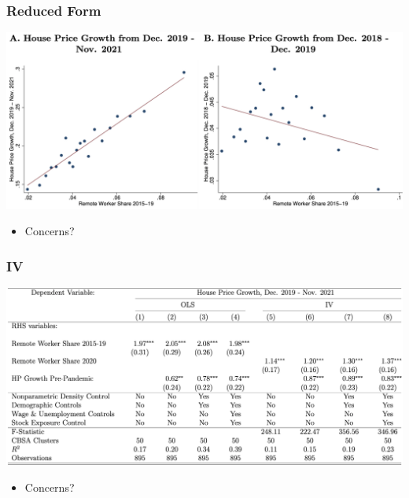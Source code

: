 \documentclass[english,xcolor=svgnames]{beamer}
\begin{document}
\begin{frame}
	\frametitle[alignment=center]{Reduced Form}
	\begin{center}
		\includegraphics[scale=0.4]{figures/MWFIG3.png}
	\end{center}
	\begin{itemize}
		\item Concerns?
	\end{itemize}
\end{frame}

\begin{frame}
	\frametitle[alignment=center]{IV}
	\begin{center}
		\includegraphics[scale=0.3]{figures/MWTAB4.png}
	\end{center}
	\begin{itemize}
		\item Concerns?
	\end{itemize}
\end{frame}
\end{document}
